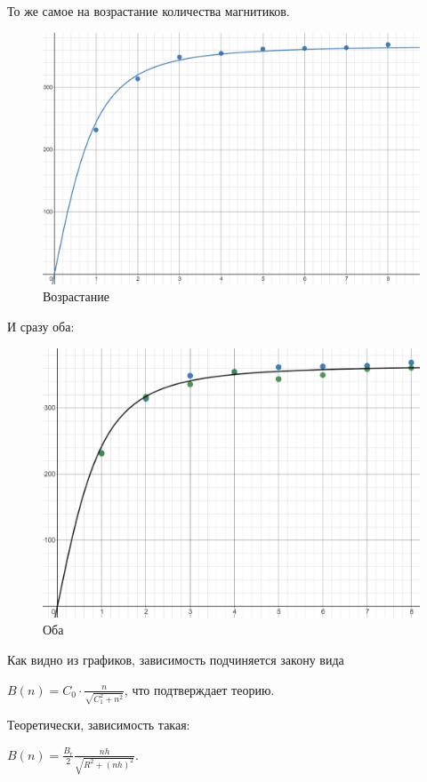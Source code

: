\documentclass[a4paper,12pt]{article} %
\begin{document}
То же самое на возрастание количества магнитиков.
\begin{figure}[h!]
	\centering
	\includegraphics[scale=0.58]{возраст.png}
	\caption*{Возрастание}
\end{figure}
\vspace{35mm}


И сразу оба:
\begin{figure}[h!]
	\centering
	\includegraphics[scale=0.7]{оба.png}
	\caption*{Оба}
\end{figure}
\newpage


Как видно из графиков, зависимость подчиняется закону вида 

$B(n) = C_0\cdot \frac{n}{\sqrt{C_1^2 + n^2}}$, что подтверждает теорию.

Теоретически, зависимость такая:

$B(n) = \frac{B_r}{2}\frac{nh}{\sqrt{R^2 + (nh)^2}}$.
\end{document}
